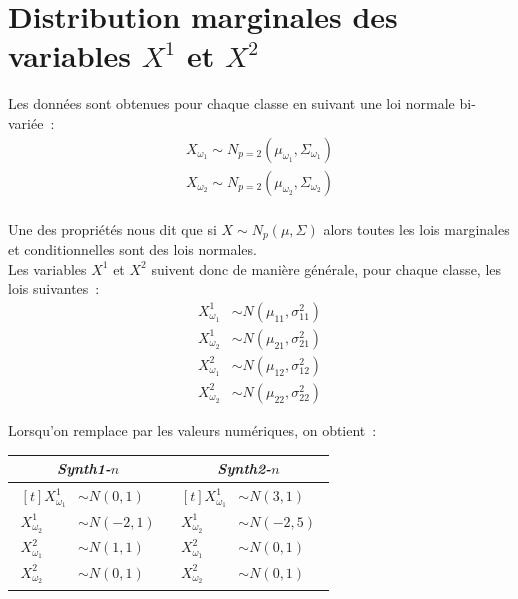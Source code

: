 \documentclass[a4paper,10pt]{report}
\begin{document}
\section{Distribution marginales des variables $X^1$ et $X^2$}


Les données sont obtenues pour chaque classe en suivant une loi normale bi-variée~: 
\begin{align*}
	X_{\omega_1} \sim N_{p=2}(\mu_{\omega_1}, \Sigma_{\omega_1}) \\
	X_{\omega_2} \sim N_{p=2}(\mu_{\omega_2}, \Sigma_{\omega_2}) \\
\end{align*}

Une des propriétés nous dit que si $X \sim N_{p}(\mu, \Sigma)$ alors toutes les lois marginales et conditionnelles sont des lois normales.\\


Les variables $X^1$ et $X^2$ suivent donc de manière générale, pour chaque classe, les lois suivantes~:
\begin{align*}
X_{\omega_1}^1 &\sim N(\mu_{11}, \sigma_{11}^2) \\
X_{\omega_2}^1 &\sim N(\mu_{21}, \sigma_{21}^2)  \\
X_{\omega_1}^2 &\sim N(\mu_{12}, \sigma_{12}^2) \\
X_{\omega_2}^2 &\sim N(\mu_{22}, \sigma_{22}^2) 
\end{align*}
	

Lorsqu'on remplace par les valeurs numériques, on obtient~:
\begin{center}
\begin{tabular}{c|c}
	\centering
	\textit{Synth1-$n$} & \textit{Synth2-$n$} \\
	\hline
	$ \begin{aligned}[t]
	X_{\omega_1}^1 &\sim N(0,1) \\
	X_{\omega_2}^1 &\sim N(-2,1) \\
	X_{\omega_1}^2 &\sim N(1,1) \\
	X_{\omega_2}^2 &\sim N(0,1)
	\end{aligned} $     
	&
	$ \begin{aligned}[t]
	X_{\omega_1}^1 &\sim N(3,1) \\
	X_{\omega_2}^1 &\sim N(-2,5) \\
	X_{\omega_1}^2 &\sim N(0,1) \\
	X_{\omega_2}^2 &\sim N(0,1)
	\end{aligned} $ \\
\end{tabular}
\end{center}
\end{document}
